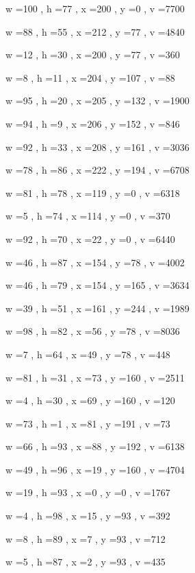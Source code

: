 \documentclass[11pt]{article}
\begin{document}
w =100 , h =77 , x =200 , y =0 , v =7700
\par
w =88 , h =55 , x =212 , y =77 , v =4840
\par
w =12 , h =30 , x =200 , y =77 , v =360
\par
w =8 , h =11 , x =204 , y =107 , v =88
\par
w =95 , h =20 , x =205 , y =132 , v =1900
\par
w =94 , h =9 , x =206 , y =152 , v =846
\par
w =92 , h =33 , x =208 , y =161 , v =3036
\par
w =78 , h =86 , x =222 , y =194 , v =6708
\par
w =81 , h =78 , x =119 , y =0 , v =6318
\par
w =5 , h =74 , x =114 , y =0 , v =370
\par
w =92 , h =70 , x =22 , y =0 , v =6440
\par
w =46 , h =87 , x =154 , y =78 , v =4002
\par
w =46 , h =79 , x =154 , y =165 , v =3634
\par
w =39 , h =51 , x =161 , y =244 , v =1989
\par
w =98 , h =82 , x =56 , y =78 , v =8036
\par
w =7 , h =64 , x =49 , y =78 , v =448
\par
w =81 , h =31 , x =73 , y =160 , v =2511
\par
w =4 , h =30 , x =69 , y =160 , v =120
\par
w =73 , h =1 , x =81 , y =191 , v =73
\par
w =66 , h =93 , x =88 , y =192 , v =6138
\par
w =49 , h =96 , x =19 , y =160 , v =4704
\par
w =19 , h =93 , x =0 , y =0 , v =1767
\par
w =4 , h =98 , x =15 , y =93 , v =392
\par
w =8 , h =89 , x =7 , y =93 , v =712
\par
w =5 , h =87 , x =2 , y =93 , v =435
\par
\newpage


\end{document}
